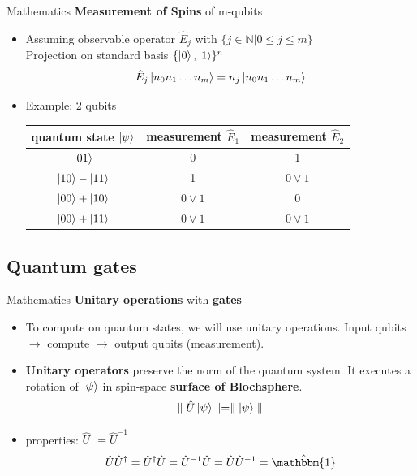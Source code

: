 \documentclass{beamer}
\begin{document}
\begin{frame}{Mathematics}
\textbf{Measurement of Spins} of m-qubits
	\begin{itemize}
    	\item Assuming observable operator $\hat{E}_j$ with $\lbrace j\in\mathbb{N} | 0 \leqslant j \leqslant m \rbrace$ \\
        Projection on standard basis $\lbrace\ket{0},\ket{1}\rbrace^n$
        \[\hat{E}_j\ket{n_0n_1\dots n_m} = n_j\ket{n_0n_1\dots n_m} \]
        \item Example: 2 qubits\\
        \begin{center}
        \begin{tabular}{|c|c|c|}
        	\hline
            quantum state $\ket{\psi}$ & measurement $\hat{E}_1$ & measurement $\hat{E}_2$ \\ 				\hline
            $\ket{01} $ & 0 & 1\\
            $\ket{10}-\ket{11}$ & 1 & $0\vee1$\\
            $\ket{00}+\ket{10}$ & $0 \vee 1$ & 0\\
            $\ket{00}+\ket{11}$ & $0 \vee 1$ & $0 \vee 1$\\
            \hline
        \end{tabular}\end{center}
	\end{itemize}
\end{frame}

\subsection{Quantum gates}
\begin{frame}{Mathematics}
\textbf{Unitary operations} with \textbf{gates}
	\begin{itemize}
    	\item To compute on quantum states, we will use unitary operations. Input qubits $\longrightarrow$ compute  $\longrightarrow$ output qubits (measurement).
        \item \textbf{Unitary operators} preserve the norm of the quantum system. It executes a rotation of $\ket{\psi}$ in spin-space \textbf{surface of Blochsphere}.
        \begin{equation}
\parallel\hat{U}\ket{\psi}\parallel=\parallel\ket{\psi}\parallel
        \end{equation}
        \item properties: $ \hat{U}^{\dagger} = \hat{U}^{-1}$ 
        	\begin{equation}
            	\hat{U}\hat{U}^{\dagger}=\hat{U}^{\dagger}\hat{U}=\hat{U}^{-1}\hat{U} = \hat{U}\hat{U}^{-1}=\hat{\mathbbm{1}} 
            \end{equation}
    \end{itemize}
\end{frame}
\end{document}
